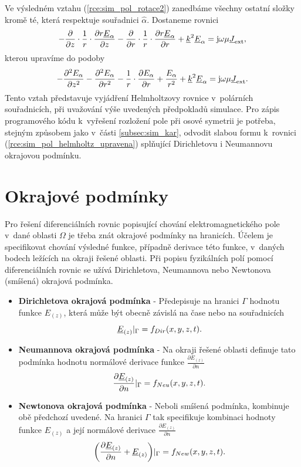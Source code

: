 Ve výsledném vztahu (\ref{rce:sim_pol_rotace2}) zanedbáme všechny ostatní složky kromě té, která respektuje souřadnici $\hat{\alpha}$. Dostaneme rovnici
\begin{displaymath}
-\frac{\partial}{\partial z}\cdot\frac{1}{r}\cdot\frac{\partial r{\underline{E}}_{\alpha}}{\partial z} - \frac{\partial}{\partial r}\cdot\frac{1}{r}\cdot\frac{\partial r{\underline{E}}_{\alpha}}{\partial r}+{\underline{k}}^{2}{\underline{E}}_{\alpha} = \mathrm{j}\omega\mu{\underline{J}}_{\mathrm{ext}},
\end{displaymath}
kterou upravíme do podoby
\begin{equation}
-\frac{\partial^{2}E_{\alpha}}{\partial z^{2}}-\frac{\partial^{2}E_{\alpha}}{\partial r^{2}}-\frac{1}{r}\cdot\frac{\partial E_{\alpha}}{\partial r} + \frac{E_{\alpha}}{r^{2}} +{\underline{k}}^{2}{\underline{E}}_{\alpha} = \mathrm{j}\omega\mu{\underline{J}}_{\mathrm{ext}}.
	\label{rce:sim_pol_helmholtz_upravena}
\end{equation}
Tento vztah představuje vyjádření Helmholtzovy rovnice v~polárních souřadnicích, při uvažování výše uvedených předpokladů simulace. Pro zápis programového kódu k~vyřešení rozložení pole při osové symetrii je potřeba, stejným způsobem jako v~části \ref{subsec:sim_kar}, odvodit slabou formu k~rovnici (\ref{rce:sim_pol_helmholtz_upravena}) 
splňující Dirichletovu i Neumannovu okrajovou podmínku. 

\section{Okrajové podmínky}
Pro řešení diferenciálních rovnic popisující chování elektromagnetického pole v~dané oblasti $\Omega$ je třeba znát okrajové podmínky na hranicích. Účelem je specifikovat chování výsledné funkce, případně derivace této funkce, v~daných bodech ležících na okraji řešené oblasti. Při popisu fyzikálních polí pomocí diferenciálních rovnic se užívá Dirichletova, Neumannova nebo Newtonova (smíšená) okrajová podmínka.
\begin{itemize}
\item {\bf Dirichletova okrajová podmínka} - Předepisuje na hranici $\Gamma$ hodnotu funkce $E_{(z)}$, která může být obecně závislá na čase nebo na souřadnicích
\begin{displaymath}
	{\underline{E}}_{(z)}|_{\Gamma} = f_{Dir}(x,y,z,t). 
\end{displaymath}
\item {\bf Neumannova okrajová podmínka} - Na okraji řešené oblasti definuje tato podmínka hodnotu normálové derivace funkce $\frac{\partial E_{(z)}}{\partial n}$
\begin{displaymath}
	\frac{\partial {\underline{E}}_{(z)}}{\partial n}|_{\Gamma} = f_{Neu}(x,y,z,t). 
\end{displaymath}
\item {\bf Newtonova okrajová podmínka} - Neboli smíšená podmínka, kombinuje obě předchozí uvedené. Na hranici $\Gamma$ tak specifikuje kombinaci hodnoty funkce $E_{(z)}$ a její normálové derivace $\frac{\partial E_{(z)}}{\partial n}$
\begin{displaymath}
	\bigg(\frac{\partial {\underline{E}}_{(z)}}{\partial n} + {\underline{E}}_{(z)}\bigg)|_{\Gamma} = f_{New}(x,y,z,t). 
\end{displaymath}
\end{itemize}

